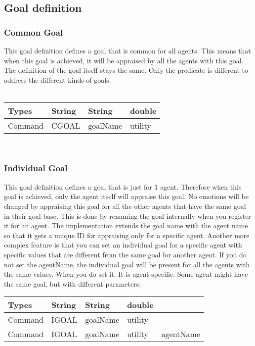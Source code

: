 \documentclass{scrartcl}
\begin{document}
\subsection{Goal definition}
\subsubsection{Common Goal}
This goal definition defines a goal that is common for all agents. This means that when this goal is achieved, it will be appraised by all the agents with this goal. The definition of the goal itself stays the same. Only the predicate is different to address the different kinds of goals.\\\
\begin{tabular}{|l|l|l|l|}
\hline  Types& String & String & double \\ 
\hline  Command & CGOAL & goalName & utility\\ 
\hline 
\end{tabular}
\\

\subsubsection{Individual Goal}
This goal definition defines a goal that is just for 1 agent. Therefore when this goal is achieved, only the agent itself will appraise this goal. No emotions will be changed by appraising this goal for all the other agents that have the same goal in their goal base. This is done by renaming the goal internally when you register it for an agent. The implementation extends the goal name with the agent name so that it gets a unique ID for appraising only for a specific agent. Another more complex feature is that you can set an individual goal for a specific agent with specific values that are different from the same goal for another agent. If you do not set the agentName, the individual goal will be present for all the agents with the same values. When you do set it. It is agent specific. Some agent might have the same goal, but with different parameters.\\
\begin{tabular}{|l|l|l|l|l|}
\hline  Types & String & String & double & \\ 
\hline  Command & IGOAL & goalName & utility &\\
\hline  Command & IGOAL & goalName & utility & agentName\\ 
\hline 
\end{tabular}
\\
\end{document}
